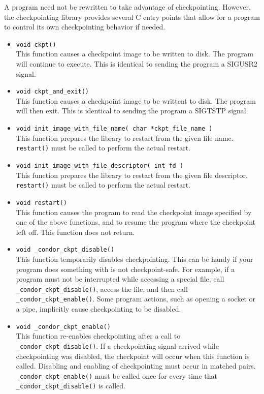 A program need not be rewritten to take advantage of checkpointing.
However, the checkpointing library provides several C entry points
that allow for a program to control its own checkpointing behavior
if needed.

\begin{itemize}

\item \verb$void ckpt()$\\
This function causes a checkpoint image to be written to disk.
The program will continue to execute.  This is identical to sending
the program a SIGUSR2 signal.

\item \verb$void ckpt_and_exit()$\\
This function causes a checkpoint image to be writtent to disk.
The program will then exit.  This is identical to sending the program
a SIGTSTP signal.

\item \verb$void init_image_with_file_name( char *ckpt_file_name )$\\
This function prepares the library to restart from the 
given file name. \verb$restart()$ must be called to perform the
actual restart.

\item \verb$void init_image_with_file_descriptor( int fd )$\\
This function prepares the library to restart from
the given file descriptor.  \verb$restart()$ must be called to
perform the actual restart.

\item \verb$void restart()$\\
This function causes the program to read the checkpoint
image specified by one of the above functions, and to resume the
program where the checkpoint left off.  This function does
not return.

\item \verb$void _condor_ckpt_disable()$\\
This function temporarily disables checkpointing.  This can
be handy if your program does something with is not checkpoint-safe.
For example, if a program must not be interrupted while accessing
a special file, call \verb$_condor_ckpt_disable()$, access the
file, and then call \verb$_condor_ckpt_enable()$.  Some program
actions, such as opening a socket or a pipe, implicitly cause
checkpointing to be disabled.

\item \verb$void _condor_ckpt_enable()$\\
This function re-enables checkpointing after a call to
\verb$_condor_ckpt_disable()$.  If a checkpointing signal arrived
while checkpointing was disabled, the checkpoint will occur when
this function is called.  Disabling and enabling of checkpointing
must occur in matched pairs.  \verb$_condor_ckpt_enable()$ must
be called once for every time that \verb$_condor_ckpt_disable()$
is called.


\end{itemize}
